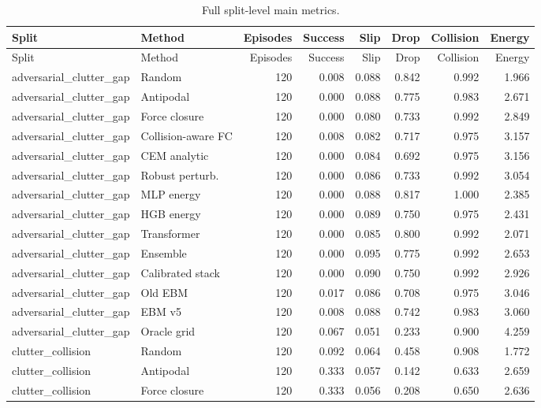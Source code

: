 {\scriptsize
\setlength{\tabcolsep}{2.5pt}
\begin{longtable}{llrrrrrr}
\caption{Full split-level main metrics.}\label{tab:full-metrics}\\
\toprule
Split & Method & Episodes & Success & Slip & Drop & Collision & Energy \\
\midrule
\endfirsthead
\toprule
Split & Method & Episodes & Success & Slip & Drop & Collision & Energy \\
\midrule
\endhead
adversarial\_clutter\_gap & Random & 120 & 0.008 & 0.088 & 0.842 & 0.992 & 1.966 \\
adversarial\_clutter\_gap & Antipodal & 120 & 0.000 & 0.088 & 0.775 & 0.983 & 2.671 \\
adversarial\_clutter\_gap & Force closure & 120 & 0.000 & 0.080 & 0.733 & 0.992 & 2.849 \\
adversarial\_clutter\_gap & Collision-aware FC & 120 & 0.008 & 0.082 & 0.717 & 0.975 & 3.157 \\
adversarial\_clutter\_gap & CEM analytic & 120 & 0.000 & 0.084 & 0.692 & 0.975 & 3.156 \\
adversarial\_clutter\_gap & Robust perturb. & 120 & 0.000 & 0.086 & 0.733 & 0.992 & 3.054 \\
adversarial\_clutter\_gap & MLP energy & 120 & 0.000 & 0.088 & 0.817 & 1.000 & 2.385 \\
adversarial\_clutter\_gap & HGB energy & 120 & 0.000 & 0.089 & 0.750 & 0.975 & 2.431 \\
adversarial\_clutter\_gap & Transformer & 120 & 0.000 & 0.085 & 0.800 & 0.992 & 2.071 \\
adversarial\_clutter\_gap & Ensemble & 120 & 0.000 & 0.095 & 0.775 & 0.992 & 2.653 \\
adversarial\_clutter\_gap & Calibrated stack & 120 & 0.000 & 0.090 & 0.750 & 0.992 & 2.926 \\
adversarial\_clutter\_gap & Old EBM & 120 & 0.017 & 0.086 & 0.708 & 0.975 & 3.046 \\
adversarial\_clutter\_gap & EBM v5 & 120 & 0.008 & 0.088 & 0.742 & 0.983 & 3.060 \\
adversarial\_clutter\_gap & Oracle grid & 120 & 0.067 & 0.051 & 0.233 & 0.900 & 4.259 \\
clutter\_collision & Random & 120 & 0.092 & 0.064 & 0.458 & 0.908 & 1.772 \\
clutter\_collision & Antipodal & 120 & 0.333 & 0.057 & 0.142 & 0.633 & 2.659 \\
clutter\_collision & Force closure & 120 & 0.333 & 0.056 & 0.208 & 0.650 & 2.636 \\

\end{longtable}}
